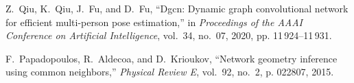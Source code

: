 \documentclass[conference]{IEEEtran}
\begin{document}
\begin{thebibliography}{00}
Z.~Qiu, K.~Qiu, J.~Fu, and D.~Fu, ``Dgcn: Dynamic graph convolutional network
for efficient multi-person pose estimation,'' in \emph{Proceedings of the
	AAAI Conference on Artificial Intelligence}, vol.~34, no.~07, 2020, pp.
11\,924--11\,931.

F.~Papadopoulos, R.~Aldecoa, and D.~Krioukov, ``Network geometry inference
  using common neighbors,'' \emph{Physical Review E}, vol.~92, no.~2, p.
  022807, 2015.

\end{thebibliography}


% 
\end{document}

